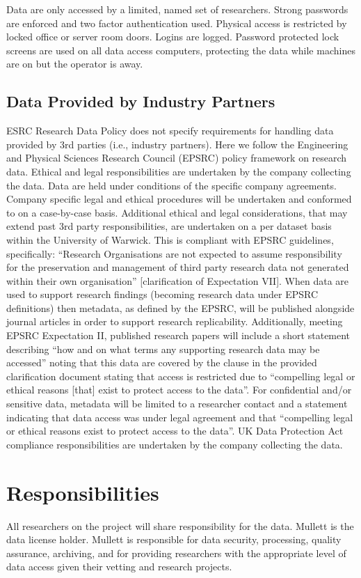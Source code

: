 \documentclass[doc]{apa6}
\begin{document}
Data are only accessed by a limited, named set of researchers. Strong passwords are enforced and two factor authentication used. Physical access is restricted by locked office or server room doors. Logins are logged. Password protected lock screens are used on all data access computers, protecting the data while machines are on but the operator is away. 

\subsection{Data Provided by Industry Partners}

ESRC Research Data Policy does not specify requirements for handling data provided by 3rd parties (i.e., industry partners). Here we follow the Engineering and Physical Sciences Research Council (EPSRC) policy framework on research data. Ethical and legal responsibilities are undertaken by the company collecting the data. Data are held under conditions of the specific company agreements. Company specific legal and ethical procedures will be undertaken and conformed to on a case-by-case basis. Additional ethical and legal considerations, that may extend past 3rd party responsibilities, are undertaken on a per dataset basis within the University of Warwick. This is compliant with EPSRC guidelines, specifically: ``Research Organisations are not expected to assume responsibility for the preservation and management of third party research data not generated within their own organisation'' [clarification of Expectation VII]. When data are used to support research findings (becoming research data under EPSRC definitions) then metadata, as defined by the EPSRC, will be published alongside journal articles in order to support research replicability. Additionally, meeting EPSRC Expectation II, published research papers will include a short statement describing ``how and on what terms any supporting research data may be accessed'' noting that this data are covered by the clause in the provided clarification document stating that access is restricted due to ``compelling legal or ethical reasons [that] exist to protect access to the data''. For confidential and/or sensitive data, metadata will be limited to a researcher contact and a statement indicating that data access was under legal agreement and that ``compelling legal or ethical reasons exist to protect access to the data''. UK Data Protection Act compliance responsibilities are undertaken by the company collecting the data. 

\section{Responsibilities}

All researchers on the project will share responsibility for the data. Mullett is the data license holder. Mullett is responsible for data security, processing, quality assurance, archiving, and for providing researchers with the appropriate level of data access given their vetting and research projects. 



%

\end{document}

